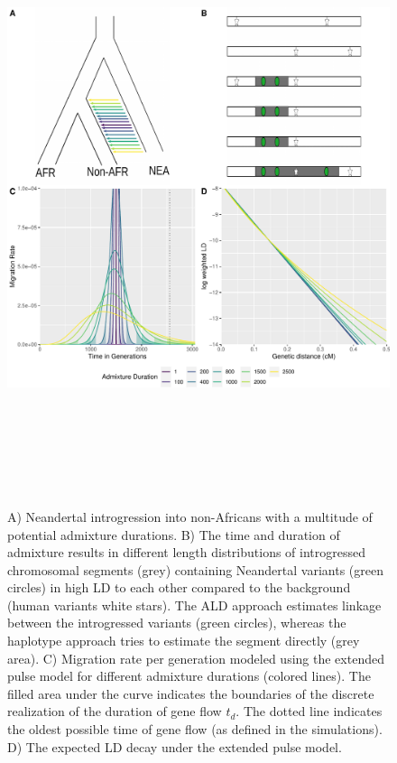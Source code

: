 \documentclass[11pt]{article}
\begin{document}
\begin{figure}
\centering
\includegraphics[width=16cm,height=18cm,keepaspectratio]{Fig_1_MBE-21-0164_R1_Peter_Iasi.pdf}
\caption{\label{fig:fig1} A) Neandertal introgression into non-Africans with a multitude of potential admixture durations. B) The time and duration of admixture results in different length distributions of introgressed chromosomal segments (grey) containing  Neandertal variants (green circles)  in high LD to each other
compared to the background (human variants white stars). The ALD approach estimates linkage
between the introgressed variants (green circles), whereas the haplotype approach tries
to estimate the segment directly (grey area). C) Migration rate per generation
modeled using the extended pulse model for different admixture durations (colored lines). The filled area under the curve indicates the boundaries of the discrete realization of the duration of gene flow $t_d$.
The dotted line indicates the oldest possible time of gene flow (as defined in the simulations). D) The expected LD decay under the extended pulse model.}
\end{figure}
\end{document}

